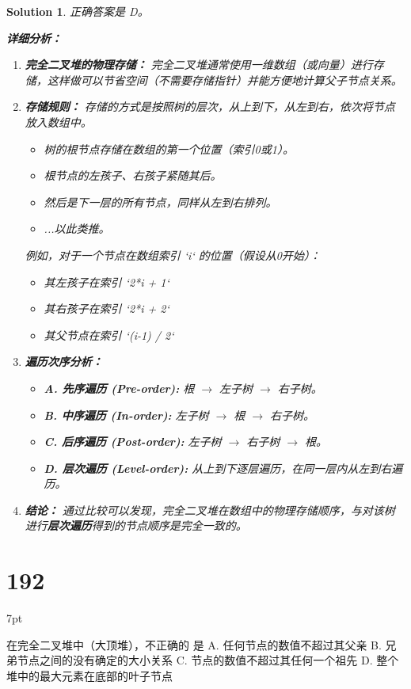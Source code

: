 \documentclass[UTF8]{report}
\newtheorem{solution}{Solution}
\theoremstyle{MyLineTheoremStyle} %
\theoremstyle{MyBlockTheoremStyle} %
\theoremstyle{MySubsubsectionStyle} %
\newenvironment{graybox}{%
        \def\FrameCommand{%
        \hspace{1pt}%
        {\color{gray}\small \vrule width 2pt}%
        {\color{graybox_color}\vrule width 4pt}%
        \colorbox{graybox_color}%
        }%
        \MakeFramed{\advance\hsize-\width\FrameRestore}%
        \noindent\hspace{-4.55pt}%
        \begin{adjustwidth}{}{7pt}%
        \vspace{2pt}\vspace{2pt}%
        }
        {%
        \vspace{2pt}\end{adjustwidth}\endMakeFramed%
        }
\begin{document}
\begin{solution}
正确答案是 D。

\textbf{详细分析：}

\begin{enumerate}
    \item \textbf{完全二叉堆的物理存储：}
    完全二叉堆通常使用一维数组（或向量）进行存储，这样做可以节省空间（不需要存储指针）并能方便地计算父子节点关系。

    \item \textbf{存储规则：}
    存储的方式是按照树的层次，从上到下，从左到右，依次将节点放入数组中。
    \begin{itemize}
        \item 树的根节点存储在数组的第一个位置（索引0或1）。
        \item 根节点的左孩子、右孩子紧随其后。
        \item 然后是下一层的所有节点，同样从左到右排列。
        \item ...以此类推。
    \end{itemize}
    例如，对于一个节点在数组索引 `i` 的位置（假设从0开始）：
    \begin{itemize}
        \item 其左孩子在索引 `2*i + 1`
        \item 其右孩子在索引 `2*i + 2`
        \item 其父节点在索引 `(i-1) / 2`
    \end{itemize}

    \item \textbf{遍历次序分析：}
    \begin{itemize}
        \item \textbf{A. 先序遍历 (Pre-order):} 根 $\to$ 左子树 $\to$ 右子树。
        \item \textbf{B. 中序遍历 (In-order):} 左子树 $\to$ 根 $\to$ 右子树。
        \item \textbf{C. 后序遍历 (Post-order):} 左子树 $\to$ 右子树 $\to$ 根。
        \item \textbf{D. 层次遍历 (Level-order):} 从上到下逐层遍历，在同一层内从左到右遍历。
    \end{itemize}

    \item \textbf{结论：}
    通过比较可以发现，完全二叉堆在数组中的物理存储顺序，与对该树进行\textbf{层次遍历}得到的节点顺序是完全一致的。
\end{enumerate}
\end{solution}


\section*{192}
\begin{graybox}
在完全二叉堆中（大顶堆），不正确的
是
A. 任何节点的数值不超过其父亲
B. 兄弟节点之间的没有确定的大小关系
C. 节点的数值不超过其任何一个祖先
D. 整个堆中的最大元素在底部的叶子节点
\end{graybox}
\end{document}
